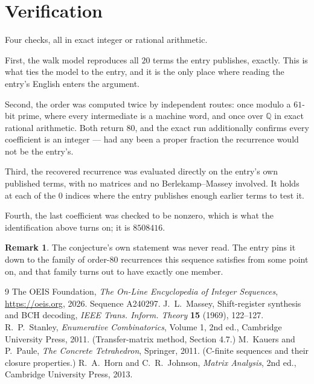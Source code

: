 \documentclass[11pt,a4paper]{article}
\theoremstyle{plain}
\theoremstyle{definition}
\newtheorem{remark}[theorem]{Remark}
\begin{document}
\section{Verification}

Four checks, all in exact integer or rational arithmetic.

First, the walk model reproduces all $20$ terms the entry publishes, exactly. This is
what ties the model to the entry, and it is the only place where reading the entry's English
enters the argument.

Second, the order was computed twice by independent routes: once modulo a $61$-bit prime, where
every intermediate is a machine word, and once over $\mathbb{Q}$ in exact rational arithmetic.
Both return $80$, and the exact run additionally confirms every coefficient is an integer
--- had any been a proper fraction the recurrence would not be the entry's.

Third, the recovered recurrence was evaluated directly on the entry's own published terms, with
no matrices and no Berlekamp--Massey involved. It holds at each of the $0$ indices where
the entry publishes enough earlier terms to test it.

Fourth, the last coefficient was checked to be nonzero, which is what the identification above
turns on; it is $8508416$.

\begin{remark}
The conjecture's own statement was never read. The entry pins it down to the family of
order-$80$ recurrences this sequence satisfies from some point on, and that family turns
out to have exactly one member.
\end{remark}

\begin{thebibliography}{9}
 The OEIS Foundation, \emph{The On-Line Encyclopedia of Integer
Sequences}, \url{https://oeis.org}, 2026. Sequence A240297.
 J.~L.~Massey, Shift-register synthesis and BCH decoding, \emph{IEEE
Trans. Inform. Theory} \textbf{15} (1969), 122--127.
 R.~P.~Stanley, \emph{Enumerative Combinatorics}, Volume 1, 2nd ed.,
Cambridge University Press, 2011. (Transfer-matrix method, Section 4.7.)
 M.~Kauers and P.~Paule, \emph{The Concrete Tetrahedron}, Springer, 2011.
(C-finite sequences and their closure properties.)
 R.~A.~Horn and C.~R.~Johnson, \emph{Matrix Analysis}, 2nd ed., Cambridge
University Press, 2013.
\end{thebibliography}
\end{document}
